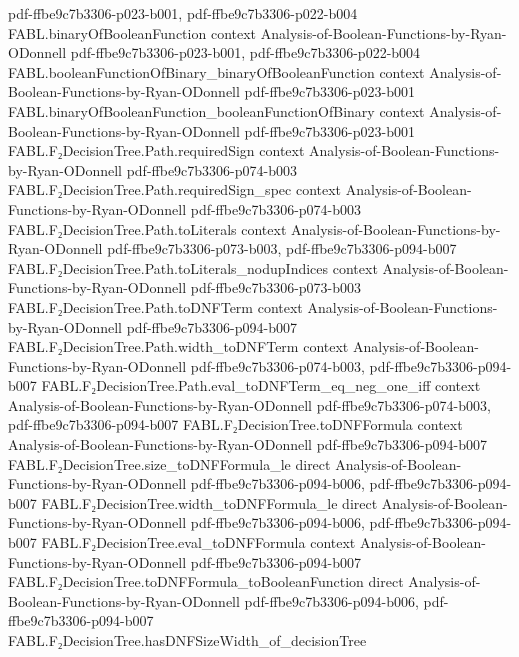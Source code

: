 \begin{theorem}
  {pdf-ffbe9c7b3306-p023-b001,
    pdf-ffbe9c7b3306-p022-b004}
\proofstep
  {FABL.binaryOfBooleanFunction}
  {context}
  {Analysis-of-Boolean-Functions-by-Ryan-ODonnell}
  {pdf-ffbe9c7b3306-p023-b001,
    pdf-ffbe9c7b3306-p022-b004}
\proofstep
  {FABL.booleanFunctionOfBinary_binaryOfBooleanFunction}
  {context}
  {Analysis-of-Boolean-Functions-by-Ryan-ODonnell}
  {pdf-ffbe9c7b3306-p023-b001}
\proofstep
  {FABL.binaryOfBooleanFunction_booleanFunctionOfBinary}
  {context}
  {Analysis-of-Boolean-Functions-by-Ryan-ODonnell}
  {pdf-ffbe9c7b3306-p023-b001}
\proofstep
  {FABL.F₂DecisionTree.Path.requiredSign}
  {context}
  {Analysis-of-Boolean-Functions-by-Ryan-ODonnell}
  {pdf-ffbe9c7b3306-p074-b003}
\proofstep
  {FABL.F₂DecisionTree.Path.requiredSign_spec}
  {context}
  {Analysis-of-Boolean-Functions-by-Ryan-ODonnell}
  {pdf-ffbe9c7b3306-p074-b003}
\proofstep
  {FABL.F₂DecisionTree.Path.toLiterals}
  {context}
  {Analysis-of-Boolean-Functions-by-Ryan-ODonnell}
  {pdf-ffbe9c7b3306-p073-b003,
    pdf-ffbe9c7b3306-p094-b007}
\proofstep
  {FABL.F₂DecisionTree.Path.toLiterals_nodupIndices}
  {context}
  {Analysis-of-Boolean-Functions-by-Ryan-ODonnell}
  {pdf-ffbe9c7b3306-p073-b003}
\proofstep
  {FABL.F₂DecisionTree.Path.toDNFTerm}
  {context}
  {Analysis-of-Boolean-Functions-by-Ryan-ODonnell}
  {pdf-ffbe9c7b3306-p094-b007}
\proofstep
  {FABL.F₂DecisionTree.Path.width_toDNFTerm}
  {context}
  {Analysis-of-Boolean-Functions-by-Ryan-ODonnell}
  {pdf-ffbe9c7b3306-p074-b003,
    pdf-ffbe9c7b3306-p094-b007}
\proofstep
  {FABL.F₂DecisionTree.Path.eval_toDNFTerm_eq_neg_one_iff}
  {context}
  {Analysis-of-Boolean-Functions-by-Ryan-ODonnell}
  {pdf-ffbe9c7b3306-p074-b003,
    pdf-ffbe9c7b3306-p094-b007}
\proofstep
  {FABL.F₂DecisionTree.toDNFFormula}
  {context}
  {Analysis-of-Boolean-Functions-by-Ryan-ODonnell}
  {pdf-ffbe9c7b3306-p094-b007}
\proofstep
  {FABL.F₂DecisionTree.size_toDNFFormula_le}
  {direct}
  {Analysis-of-Boolean-Functions-by-Ryan-ODonnell}
  {pdf-ffbe9c7b3306-p094-b006,
    pdf-ffbe9c7b3306-p094-b007}
\proofstep
  {FABL.F₂DecisionTree.width_toDNFFormula_le}
  {direct}
  {Analysis-of-Boolean-Functions-by-Ryan-ODonnell}
  {pdf-ffbe9c7b3306-p094-b006,
    pdf-ffbe9c7b3306-p094-b007}
\proofstep
  {FABL.F₂DecisionTree.eval_toDNFFormula}
  {context}
  {Analysis-of-Boolean-Functions-by-Ryan-ODonnell}
  {pdf-ffbe9c7b3306-p094-b007}
\proofstep
  {FABL.F₂DecisionTree.toDNFFormula_toBooleanFunction}
  {direct}
  {Analysis-of-Boolean-Functions-by-Ryan-ODonnell}
  {pdf-ffbe9c7b3306-p094-b006,
    pdf-ffbe9c7b3306-p094-b007}
\proofstep
  {FABL.F₂DecisionTree.hasDNFSizeWidth_of_decisionTree}

\end{theorem}
